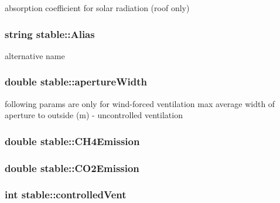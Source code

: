 absorption coefficient for solar radiation (roof only) \hypertarget{classstable_a271c0bd63a923bc1073e0055a5d023bf}{
\subsubsection[{Alias}]{\setlength{\rightskip}{0pt plus 5cm}string {\bf stable::Alias}}}
\label{classstable_a271c0bd63a923bc1073e0055a5d023bf}


alternative name \hypertarget{classstable_a1abeb022b24c9def3485ea890c8b1883}{
\subsubsection[{apertureWidth}]{\setlength{\rightskip}{0pt plus 5cm}double {\bf stable::apertureWidth}}}
\label{classstable_a1abeb022b24c9def3485ea890c8b1883}
following params are only for wind-\/forced ventilation max average width of aperture to outside (m) -\/ uncontrolled ventilation \hypertarget{classstable_aadb2a305188cecdae4ebdb8a519ce6ef}{
\subsubsection[{CH4Emission}]{\setlength{\rightskip}{0pt plus 5cm}double {\bf stable::CH4Emission}}}
\label{classstable_aadb2a305188cecdae4ebdb8a519ce6ef}
\hypertarget{classstable_aa54ec15545c243cd78c81c79a517dbab}{
\subsubsection[{CO2Emission}]{\setlength{\rightskip}{0pt plus 5cm}double {\bf stable::CO2Emission}}}
\label{classstable_aa54ec15545c243cd78c81c79a517dbab}
\hypertarget{classstable_a48d5bedebd1be85d7705e59fe5a834b5}{
\subsubsection[{controlledVent}]{\setlength{\rightskip}{0pt plus 5cm}int {\bf stable::controlledVent}}}
\label{classstable_a48d5bedebd1be85d7705e59fe5a834b5}


